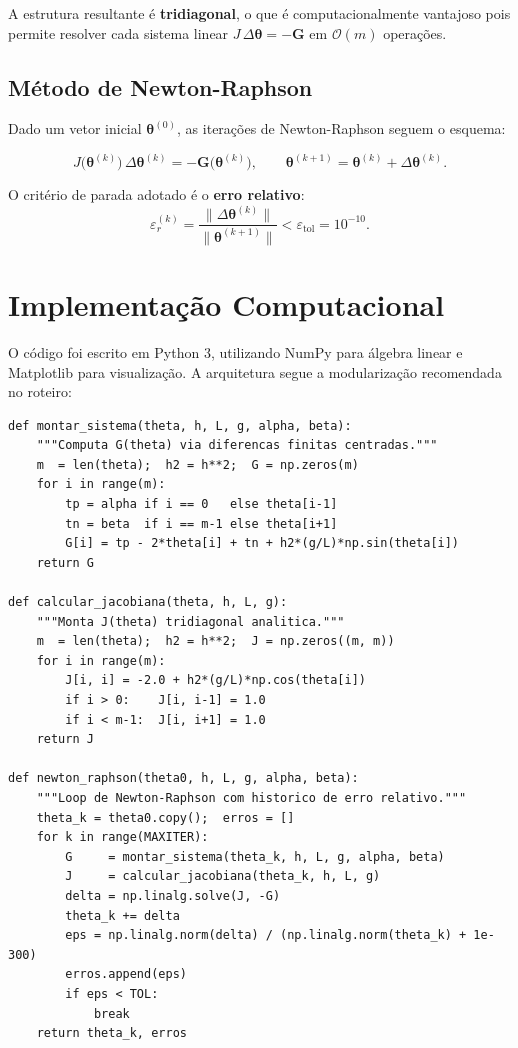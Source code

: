 \documentclass[
  12pt,
  a4paper,
  chapter=TITLE,
  section=TITLE,
  brazil,
  oneside
]{abntex2}
\begin{document}
A estrutura resultante é \textbf{tridiagonal}, o que é computacionalmente vantajoso
pois permite resolver cada sistema linear $J\,\Delta\boldsymbol{\theta} = -\mathbf{G}$
em $\mathcal{O}(m)$ operações.

\subsection{Método de Newton-Raphson}

Dado um vetor inicial $\boldsymbol{\theta}^{(0)}$, as iterações de Newton-Raphson
seguem o esquema:

\begin{equation}
  J\!\bigl(\boldsymbol{\theta}^{(k)}\bigr)\,
  \Delta\boldsymbol{\theta}^{(k)}
  = -\mathbf{G}\!\bigl(\boldsymbol{\theta}^{(k)}\bigr),
  \qquad
  \boldsymbol{\theta}^{(k+1)} = \boldsymbol{\theta}^{(k)} + \Delta\boldsymbol{\theta}^{(k)}.
  \label{eq:newton}
\end{equation}

O critério de parada adotado é o \textbf{erro relativo}:
\begin{equation}
  \varepsilon_r^{(k)} =
    \frac{\|\Delta\boldsymbol{\theta}^{(k)}\|}{\|\boldsymbol{\theta}^{(k+1)}\|}
    < \varepsilon_\text{tol} = 10^{-10}.
\end{equation}

\section{Implementação Computacional}

O código foi escrito em Python 3, utilizando NumPy para álgebra linear e Matplotlib
para visualização. A arquitetura segue a modularização recomendada no roteiro:

\begin{lstlisting}[caption={Funções principais da implementação.},
                   label={lst:codigo}]
def montar_sistema(theta, h, L, g, alpha, beta):
    """Computa G(theta) via diferencas finitas centradas."""
    m  = len(theta);  h2 = h**2;  G = np.zeros(m)
    for i in range(m):
        tp = alpha if i == 0   else theta[i-1]
        tn = beta  if i == m-1 else theta[i+1]
        G[i] = tp - 2*theta[i] + tn + h2*(g/L)*np.sin(theta[i])
    return G

def calcular_jacobiana(theta, h, L, g):
    """Monta J(theta) tridiagonal analitica."""
    m  = len(theta);  h2 = h**2;  J = np.zeros((m, m))
    for i in range(m):
        J[i, i] = -2.0 + h2*(g/L)*np.cos(theta[i])
        if i > 0:    J[i, i-1] = 1.0
        if i < m-1:  J[i, i+1] = 1.0
    return J

def newton_raphson(theta0, h, L, g, alpha, beta):
    """Loop de Newton-Raphson com historico de erro relativo."""
    theta_k = theta0.copy();  erros = []
    for k in range(MAXITER):
        G     = montar_sistema(theta_k, h, L, g, alpha, beta)
        J     = calcular_jacobiana(theta_k, h, L, g)
        delta = np.linalg.solve(J, -G)
        theta_k += delta
        eps = np.linalg.norm(delta) / (np.linalg.norm(theta_k) + 1e-300)
        erros.append(eps)
        if eps < TOL:
            break
    return theta_k, erros
\end{lstlisting}
\end{document}
